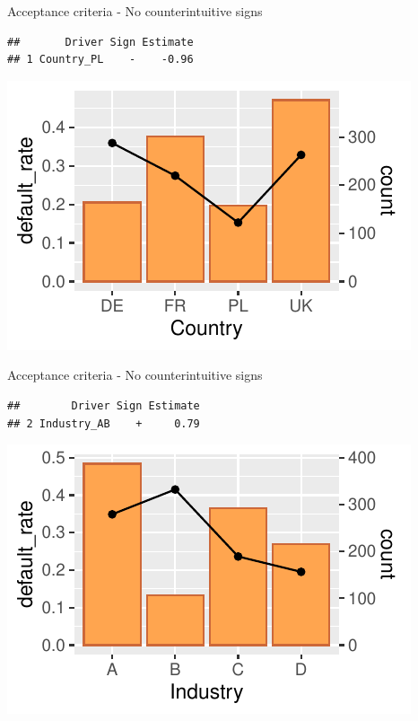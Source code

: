 \documentclass[9pt,ignorenonframetext,]{beamer}
\begin{document}
\begin{frame}[fragile]{Acceptance criteria - No counterintuitive signs}

\begin{verbatim}
##       Driver Sign Estimate
## 1 Country_PL    -    -0.96
\end{verbatim}

\includegraphics{Risk-Models-Development-Process_files/figure-beamer/unnamed-chunk-52-1.pdf}

\end{frame}

\begin{frame}[fragile]{Acceptance criteria - No counterintuitive signs}

\begin{verbatim}
##        Driver Sign Estimate
## 2 Industry_AB    +     0.79
\end{verbatim}

\includegraphics{Risk-Models-Development-Process_files/figure-beamer/unnamed-chunk-53-1.pdf}

\end{frame}
\end{document}
